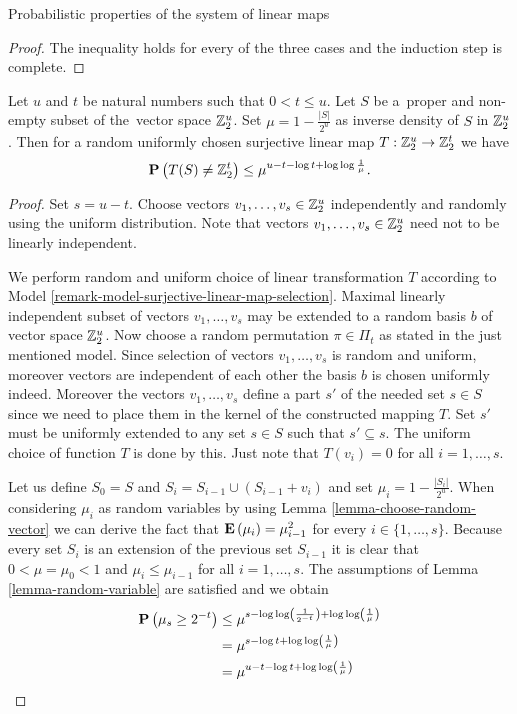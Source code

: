 \begin{section}{Probabilistic properties of the system of linear maps}
\begin{proof}
The inequality holds for every of the three cases and the induction step is complete.
\end{proof}

\begin{theorem}
\label{theorem-linear-function-set-onto}
Let $u$ and $t$ be natural numbers such that $0 < t \leq u$. Let $S$ be a~proper and non-empty subset of the~vector space $\mathbb{Z}_{2}^{u}$. Set $\mu = 1 - \frac{|S|}{2^u}$ as inverse density of $S$ in $\mathbb{Z}_{2}^{u}$. Then for a random uniformly chosen surjective linear map $T: \mathbb{Z}_{2}^{u} \rightarrow \mathbb{Z}_{2}^{t}$ we have
\[
	\mathbf{P}\left(T(S) \neq \mathbb{Z}_{2}^{t}\right) \leq \mu^{u - t - \log t + \log \log \frac{1}{\mu}} \textit{.}
\]
\end{theorem}
\begin{proof}
Set $s = u - t$. Choose vectors $v_1, \dots, v_s \in \mathbb{Z}_{2}^{u}$ independently and randomly using the uniform distribution. Note that vectors $v_1, \dots, v_s \in \mathbb{Z}_{2}^{u}$ need not to be linearly independent.

We perform random and uniform choice of linear transformation $T$ according to Model \ref{remark-model-surjective-linear-map-selection}. Maximal linearly independent subset of vectors $v_1, \dots, v_s$ may be extended to a random basis $b$ of vector space $\mathbb{Z}_{2}^{u}$. Now choose a random permutation $\pi \in \Pi_t$ as stated in the just mentioned model. Since selection of vectors $v_1, \dots, v_s$ is random and uniform, moreover vectors are independent of each other the basis $b$ is chosen uniformly indeed. Moreover the vectors $v_1, \dots, v_s$ define a part $s'$ of the needed set $s \in S$ since we need to place them in the kernel of the constructed mapping $T$. Set $s'$ must be uniformly extended to any set $s \in S$ such that $s' \subseteq s$. The uniform choice of function $T$ is done by this. Just note that $T(v_i) = 0$ for all $i = 1, \dots, s$.	

Let us define $S_0 = S$ and $S_i = S_{i - 1} \cup (S_{i - 1} + v_i)$ and set $\mu_i = 1 - \frac{|S_i|}{2 ^ u}$. When considering $\mu_i$ as random variables by using Lemma \ref{lemma-choose-random-vector} we can derive the fact that $\mathbf{E}\left(\mu_i\right) = \mu_{i - 1} ^ 2$ for every $i \in \{1, \dots, s \}$. Because every set $S_i$ is an extension of the previous set $S_{i - 1}$ it is clear that $0 < \mu = \mu_0 < 1$ and $\mu_i \leq \mu_{i - 1}$ for all $i = 1, \dots, s$. The assumptions of Lemma \ref{lemma-random-variable} are satisfied and we obtain
\[
\begin{split}
\mathbf{P}\left(\mu_s \geq 2 ^ {-t}\right) 
	& \leq \mu ^ {s - \log \log \left(\frac{1}{2 ^ {-t}}\right) + \log \log \left( \frac{1}{\mu} \right)} \\
	& = \mu ^ {s - \log t + \log \log \left(\frac{1}{\mu}\right)} \\
	& = \mu ^ {u - t - \log t + \log \log \left(\frac{1}{\mu}\right)}
\end{split}
\]


\end{proof}
\end{section}
